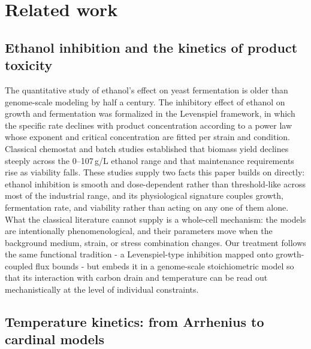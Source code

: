 \documentclass[12pt]{article}
\begin{document}
\section{Related work}
\label{sec:related}

\subsection{Ethanol inhibition and the kinetics of product toxicity}

The quantitative study of ethanol's effect on yeast fermentation is older
than genome-scale modeling by half a century. The inhibitory effect of
ethanol on growth and fermentation was formalized in the Levenspiel
framework, in which the specific rate declines with product concentration
according to a power law whose exponent and critical concentration are
fitted per strain and condition. Classical chemostat and batch studies
established that biomass yield declines steeply across the 0--107\,g/L
ethanol range and that maintenance requirements rise as viability falls.
These studies supply two facts this paper builds on directly: ethanol
inhibition is smooth and dose-dependent rather than threshold-like across
most of the industrial range, and its physiological signature couples
growth, fermentation rate, and viability rather than acting on any one of
them alone. What the classical literature cannot supply is a whole-cell
mechanism: the models are intentionally phenomenological, and their
parameters move when the background medium, strain, or stress combination
changes. Our treatment follows the same functional tradition - a
Levenspiel-type inhibition mapped onto growth-coupled flux bounds - but
embeds it in a genome-scale stoichiometric model so that its interaction
with carbon drain and temperature can be read out mechanistically at the
level of individual constraints.

\subsection{Temperature kinetics: from Arrhenius to cardinal models}
\end{document}
